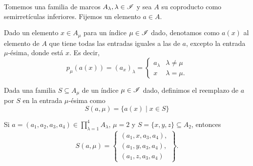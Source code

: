\begin{definition}
  Tomemos una familia de marcos $A_\lambda, \lambda\in\mathscr{I}$ y sea
  $A$ su coproducto como semirretículas inferiores. Fijemos un
  elemento $a\in A$.
  
  Dado un elemento $x\in A_\mu$ para un índice $\mu\in\mathscr{I}$ dado,
  denotamos como $a(x)$ al elemento de $A$ que tiene todas las
  entradas iguales a las de  $a$, excepto la entrada $\mu$-ésima,
  donde está $x$. Es decir,
  \[
    p_\mu(a(x)) = (a_x)_\lambda =
    \begin{cases}
      a_\lambda & \lambda\neq\mu \\
      x & \lambda = \mu.
    \end{cases}
  \]

  Dada una familia $S\subseteq A_\mu$ de un índice $\mu\in\mathscr{I}$
  dado, definimos el reemplazo de $a$ por $S$ en la entrada
  $\mu$-ésima como
  \[
    S(a,\mu)
    =
    \{a(x) \mid x\in S\}
  \]
\end{definition}
\begin{example}
Si $a=(a_1,a_2,a_3,a_4)\in\prod_{\lambda=1}^4A_\lambda$, $\mu=2$ y $S=\{x,y,z\}\subseteq A_2$, entonces
    \[
      S(a,\mu) = \left\{
      \begin{array}{c}
        (a_1,x,a_3,a_4), \\
        (a_1,y,a_3,a_4), \\
        (a_1,z,a_3,a_4)
      \end{array}
      \right\}
    .\]
\end{example}


